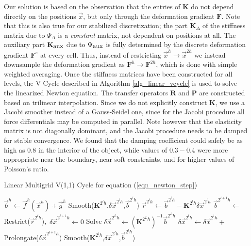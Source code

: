 Our solution is based on the observation that the entries of $\mathbf{K}$ do not depend directly on the positions $\vec{x}$, but only through the deformation gradient $\mathbf{F}$. Note
that this is also true for our stabilized discretization; the part $\mathbf{K}_\Delta$ of the stiffness matrix due to $\Psi_\Delta$ is a \emph{constant} matrix, not dependent on positions
at all. The auxiliary part $\mathbf{K}_{\mbox{\small aux}}$ due to $\Psi_{\mbox{\small aux}}$ is fully determined by the discrete deformation gradient $\mathbf{F}^e$ at every
cell. Thus, instead of restricting $\vec{x}^h\rightarrow\vec{x}^{2h}$ we instead downsample the deformation gradient as $\mathbf{F}^h\rightarrow\mathbf{F}^{2h}$, which is done with
simple weighted averaging. Once the stiffness matrices have been constructed for all levels, the V-Cycle described in Algorithm \ref{alg_linear_vcycle} is used to solve the linearized
Newton equation. The transfer operators $\mathbf{R}$ and $\mathbf{P}$ are constructed based on trilinear interpolation. Since we do not explicitly construct $\mathbf{K}$, we use a
Jacobi smoother instead of a Gauss-Seidel one, since for the Jacobi procedure all force differentials may be computed in parallel. Note however that the elasticity matrix is not
diagonally dominant, and the Jacobi procedure needs to be damped for stable convergence. We found that the damping coefficient could safely be as high as $0.8$ in the interior of the
object, while values of $0.3-0.4$ were more appropriate near the boundary, near soft constraints, and for higher values of Poisson's ratio.

\begin{algorithm}[h]
\caption{Linear Multigrid V(1,1) Cycle for equation (\ref{eqn_newton_step})}\label{alg_linear_vcycle}
\begin{algorithmic}[1]
\State $\vec{b}^h\gets \vec{f}^h(\vec{x}^h)+\vec{g}^h$
\State Smooth($\mathbf{K}^{2^lh}$,$\delta\vec{x}^{2^lh}$,$\vec{b}^{2^lh}$)
\State $\vec{r}^{2^lh}\gets\vec{b}^{2^lh}-\mathbf{K}^{2^lh}\delta\vec{x}^{2^lh}$
\State $\vec{b}^{2^{l+1}h}\gets$Restrict($\vec{r}^{2^lh}$),\ $\delta\vec{x}^{2^{l+1}h}\gets 0$
\EndFor
\State Solve $\delta\vec{x}^{2^Lh}\gets (\mathbf{K}^{2^Lh})^{-1}\vec{b}^{2^Lh}$
\State $\delta\vec{x}^{2^lh}\gets \delta\vec{x}^{2^lh}+$Prolongate($\delta\vec{x}^{2^{l+1}h}$)
\State Smooth($\mathbf{K}^{2^lh}$,$\delta\vec{x}^{2^lh}$,$\vec{b}^{2^lh}$)
\EndFor
\EndProcedure
\end{algorithmic}
\end{algorithm}

